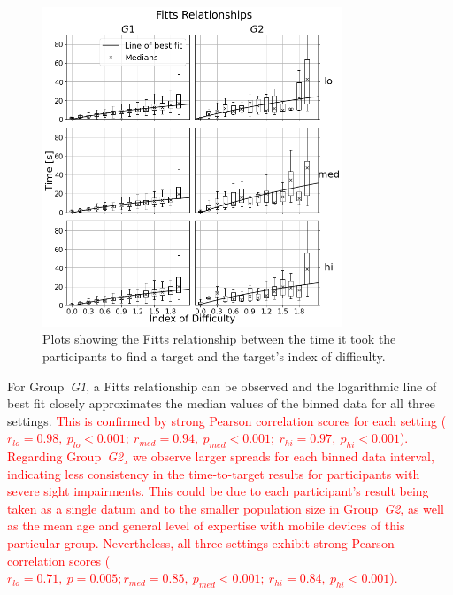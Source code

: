 \documentclass[acmsmall]{acmart}
\newcommand\hl[1]{\textcolor{red}{#1}}
\begin{document}
\begin{figure}
  \centering
  \includegraphics[width=0.8\textwidth]{figures/fitts_fit.png}
  \caption{Plots showing the Fitts relationship between the time it took the participants to find a target and the target's index of difficulty. }\label{fig:fitts-results}
\end{figure}

For Group~\textit{G1}, a Fitts relationship can be observed and the logarithmic line of best fit closely approximates the median values of the binned data for all three settings. 
\hl{This is confirmed by strong Pearson correlation scores for each setting ($r_{lo} = 0.98,~p_{lo}<0.001;~r_{med}=0.94,~p_{med}<0.001;~r_{hi} = 0.97,~p_{hi}<0.001$).
Regarding Group~\textit{G2}¸ we observe larger spreads for each binned data interval, indicating less consistency in the time-to-target results for participants with severe sight impairments.
This could be due to each participant's result being taken as a single datum and to the smaller population size in Group~\textit{G2}, as well as the mean age and general level of expertise with mobile devices of this particular group.
Nevertheless, all three settings exhibit strong Pearson correlation scores ($r_{lo}=0.71,~p=0.005;r_{med}=0.85,~p_{med}<0.001;~r_{hi}=0.84,~p_{hi}<0.001$).}
\end{document}
